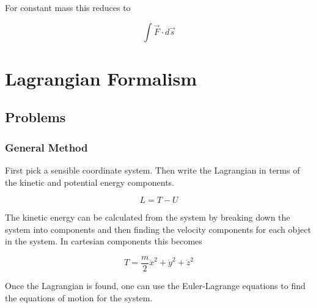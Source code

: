 \documentclass{tufte-book}
\begin{document}
For constant mass this reduces to

\begin{equation}
	\label{eq:21}
	\int\vec{F}\cdot d\vec{s}
\end{equation}



\chapter{Lagrangian Formalism}


\section{Problems}
\subsection{General Method}
First pick a sensible coordinate system. Then write the Lagrangian in terms of the kinetic and potential energy components.

\begin{equation}
	L = T - U
\end{equation}

The kinetic energy can be calculated from the system by breaking down the system into components and then finding the velocity components for each object in the system. In cartesian components this becomes

\begin{equation}
	T = \frac{m}{2}\dot{x}^2+\dot{y}^2+\dot{z}^2
\end{equation}

Once the Lagrangian is found, one can use the Euler-Lagrange equations to find the equations of motion for the system.


\backmatter





\printindex
\end{document}
